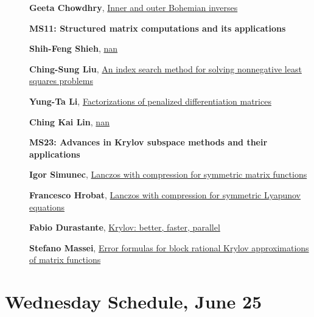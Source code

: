\documentclass[ILAS2025-program.tex]{subfiles}
\begin{document}
\begin{description}
\begin{description}
        \item[] \hypertarget{up0232}{}\textbf{Geeta Chowdhry}, \hyperlink{down0232}{Inner and outer Bohemian inverses}
        \end{description}
    \begin{description}
    \item[] {\color{mstitle}\textbf{MS11: Structured matrix computations and its applications}} 
    \item[] \hypertarget{up0233}{}\textbf{Shih-Feng Shieh}, \hyperlink{down0233}{nan}
        \item[] \hypertarget{up0234}{}\textbf{Ching-Sung Liu}, \hyperlink{down0234}{An index search method for solving nonnegative least squares problems
}
        \item[] \hypertarget{up0235}{}\textbf{Yung-Ta Li}, \hyperlink{down0235}{Factorizations of penalized differentiation matrices
}
        \item[] \hypertarget{up0236}{}\textbf{Ching Kai Lin}, \hyperlink{down0236}{nan}
        \end{description}
    \begin{description}
    \item[] {\color{mstitle}\textbf{MS23: Advances in Krylov subspace methods and their applications}} 
    \item[] \hypertarget{up0237}{}\textbf{Igor Simunec}, \hyperlink{down0237}{Lanczos with compression for symmetric matrix functions}
        \item[] \hypertarget{up0238}{}\textbf{Francesco Hrobat}, \hyperlink{down0238}{Lanczos with compression for symmetric Lyapunov equations}
        \item[] \hypertarget{up0239}{}\textbf{Fabio Durastante}, \hyperlink{down0239}{Krylov: better, faster, parallel}
        \item[] \hypertarget{up0240}{}\textbf{Stefano Massei}, \hyperlink{down0240}{Error formulas for block rational Krylov approximations of matrix functions}
        \end{description}
    \end{description}
    \newpage

\section{Wednesday Schedule, June 25}
    
\end{document}
